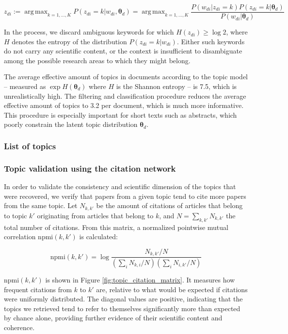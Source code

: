 \documentclass{article}
\DeclareMathOperator*{\argmax}{arg\,max}
\begin{document}
\begin{equation}
    z_{di} := \argmax_{k=1,\dots,K} P(z_{di}=k|w_{di},\bm{\theta}_{d}) =  \argmax_{k=1,\dots,K} \dfrac{P(w_{di}|z_{di}=k)P(z_{di}=k|\bm{\theta}_d)}{P(w_{di}|\bm{\theta}_d)}
\end{equation}

In the process, we discard ambiguous keywords for which $H(z_{di})\geq \log{2}$, where $H$ denotes the entropy of the distribution $P(z_{di}=k|w_{di})$. Either such keywords do not carry any scientific content, or the context is insufficient to disambiguate among the possible research areas to which they might belong.

The average effective amount of topics in documents according to the topic model -- measured as $\exp H(\bm{\theta}_{d})$ where $H$ is the Shannon entropy -- is 7.5, which is unrealistically high. The filtering and classification procedure reduces the average effective amount of topics to 3.2 per document, which is much more informative. This procedure is especially important for short texts such as abstracts, which poorly constrain the latent topic distribution $\bm{\theta}_{d}$.

\subsubsection{List of topics}

\fontsize{6}{7}\selectfont\normalsize

\subsubsection{\label{appendix:citation_validation}Topic validation using the citation network}

In order to validate the consistency and scientific dimension of the topics that were recovered, we verify that papers from a given topic tend to cite more papers from the same topic. Let $N_{k,k'}$ be the amount of citations of articles that belong to topic $k'$ originating from articles that belong to $k$, and $N=\sum_{k,k'}N_{k,k'}$ the total number of citations. From this matrix, a normalized pointwise mutual correlation $\mathrm{npmi}(k,k')$ is calculated:

\begin{equation}
    \mathrm{npmi}(k,k') = \log {\dfrac{N_{k,k'}/N}{(\sum_{i} N_{k,i}/N)(\sum_{i} N_{i,k'}/N)}}
\end{equation}

$\mathrm{npmi}(k,k')$ is shown in Figure \ref{fig:topic_citation_matrix}. It measures how frequent citations from $k$ to $k'$ are, relative to what would be expected if citations were uniformly distributed. The diagonal values are positive, indicating that the topics we retrieved tend to refer to themselves significantly more than expected by chance alone, providing further evidence of their scientific content and coherence.
\end{document}

